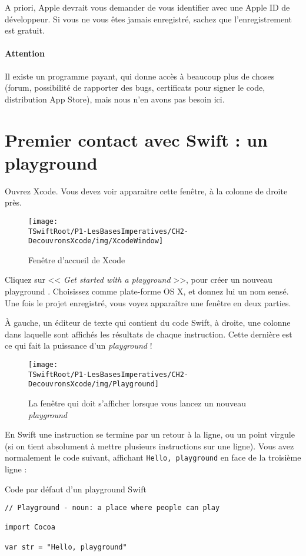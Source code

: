 A priori, Apple devrait vous demander de vous identifier avec une Apple ID de développeur. Si vous ne vous êtes jamais enregistré, sachez que l'enregistrement est gratuit.

\paragraph{Attention}
Il existe un programme payant, qui donne accès à beaucoup plus de choses (forum, possibilité de rapporter des bugs, certificats pour signer le code, distribution App Store), mais nous n'en avons pas besoin ici.


\section{Premier contact avec Swift : un playground}
Ouvrez Xcode.
Vous devez voir apparaitre cette fenêtre, à la colonne de droite près.
\begin{figure}[H]
\centering
\texttt{[image: \\TSwiftRoot/P1-LesBasesImperatives/CH2-DecouvronsXcode/img/XcodeWindow]}
\caption{Fenêtre d'accueil de Xcode}
\end{figure}

Cliquez sur << \emph{Get started with a playground} >>,
pour créer un nouveau \og playground \fg{}.
Choisissez comme plate-forme OS X, et donnez lui un nom sensé.
Une fois le projet enregistré, vous voyez apparaître une fenêtre en deux parties.

À gauche, un éditeur de texte qui contient du code Swift, à droite, une colonne dans laquelle sont affichés les résultats de chaque instruction. Cette dernière est ce qui fait la puissance d’un \emph{playground} !

\begin{figure}[H]
\centering
\texttt{[image: \\TSwiftRoot/P1-LesBasesImperatives/CH2-DecouvronsXcode/img/Playground]}
\caption{La fenêtre qui doit s’afficher lorsque vous lancez un nouveau \emph{playground}}
\end{figure}


En Swift une instruction se termine par un retour à la ligne, ou un point virgule
(si on tient absolument à mettre plusieurs instructions sur une ligne).
Vous avez normalement le code suivant,
affichant \verb"Hello, playground" en face de la troisième ligne :
\begin{listing}[H]
\caption{Code par défaut d'un \og playground \fg{} Swift}
\begin{verbatim}
// Playground - noun: a place where people can play

import Cocoa

var str = "Hello, playground"
\end{verbatim}
\end{listing}

